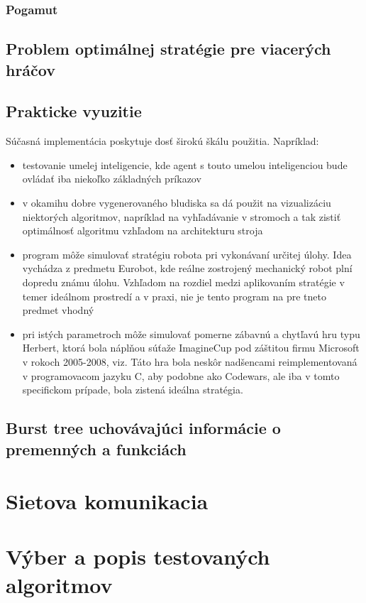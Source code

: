 \documentclass[12pt,notitlepage]{report}
\begin{document}
\subsection {Pogamut}
\section{Problem optimálnej stratégie pre viacerých hráčov}
\section{Prakticke vyuzitie}
Súčasná implementácia poskytuje dosť širokú škálu použitia. Napríklad:\\
	\begin{itemize}
	\item testovanie umelej inteligencie, kde agent s touto umelou inteligenciou bude ovládať iba niekoľko základných príkazov
	\item v okamihu dobre vygenerovaného bludiska sa dá použit na vizualizáciu niektorých algoritmov, napríklad na vyhľadávanie v stromoch a tak zistiť optimálnosť algoritmu vzhľadom na architekturu stroja
	\item program môže simulovať stratégiu robota pri vykonávaní určitej úlohy. Idea vychádza z predmetu Eurobot, kde reálne zostrojený mechanický robot plní dopredu známu úlohu. Vzhľadom na rozdiel medzi aplikovaním stratégie v temer ideálnom prostredí a v praxi, nie je tento program na pre tneto predmet vhodný
	\item pri istých parametroch môže simulovať pomerne zábavnú a chytľavú hru typu Herbert, ktorá bola náplňou súťaže ImagineCup pod záštitou firmu Microsoft v rokoch 2005-2008, viz\cite{imaginecup}. Táto hra bola neskôr nadšencami reimplementovaná v programovacom jazyku C, aby podobne ako Codewars, ale iba v tomto specifickom prípade, bola zistená ideálna stratégia. %
	\end{itemize}


\section {Burst tree uchovávajúci informácie o premenných a funkciách} 
\chapter{Sietova komunikacia}
\chapter{Výber a popis testovaných algoritmov}
\end{document}
